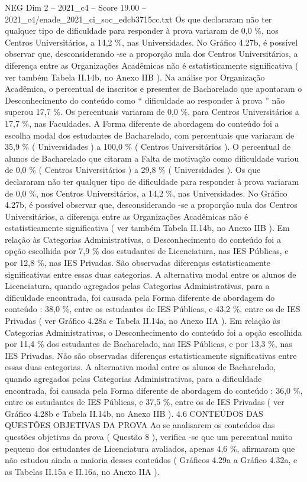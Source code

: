 \begin{textsample}{NEG Dim 2 – 2021\_c4 – Score 19.00 – 2021\_c4/enade\_2021\_ci\_soc\_edcb3715cc.txt}
Os que declararam não ter qualquer tipo de dificuldade para responder à prova variaram de 0,0 \%, nos Centros Universitários, a 14,2 \%, nas Universidades.
No Gráfico 4.27b, é possível observar que, desconsiderando -se a proporção nula dos Centros Universitários, a diferença entre as Organizações Acadêmicas não é estatisticamente significativa ( ver também Tabela II.14b, no Anexo IIB ).
Na análise por Organização Acadêmica, o percentual de inscritos e presentes de Bacharelado que apontaram o Desconhecimento do conteúdo como “ dificuldade ao responder à prova ” não superou 17,7 \%.
Os percentuais variaram de 0,0 \%, para Centros Universitários a 17,7 \%, nas Faculdades.
A Forma diferente de abordagem do conteúdo foi a escolha modal dos estudantes de Bacharelado, com percentuais que variaram de 35,9 \% ( Universidades ) a 100,0 \% ( Centros Universitários ).
O percentual de alunos de Bacharelado que citaram a Falta de motivação como dificuldade variou de 0,0 \% ( Centros Universitários ) a 29,8 \% ( Universidades ).
Os que declararam não ter qualquer tipo de dificuldade para responder à prova variaram de 0,0 \%, nos Centros Universitários, a 14,2 \%, nas Universidades.
No Gráfico 4.27b, é possível observar que, desconsiderando -se a proporção nula dos Centros Universitários, a diferença entre as Organizações Acadêmicas não é estatisticamente significativa ( ver também Tabela II.14b, no Anexo IIB ).
Em relação às Categorias Administrativas, o Desconhecimento do conteúdo foi a opção escolhida por 7,9 \% dos estudantes de Licenciatura, nas IES Públicas, e por 12,8 \%, nas IES Privadas.
São observadas diferenças estatisticamente significativas entre essas duas categorias.
A alternativa modal entre os alunos de Licenciatura, quando agregados pelas Categorias Administrativas, para a dificuldade encontrada, foi causada pela Forma diferente de abordagem do conteúdo : 38,0 \%, entre os estudantes de IES Públicas, e 43,2 \%, entre os de IES Privadas ( ver Gráfico 4.28a e Tabela II.14a, no Anexo IIA ).
Em relação às Categorias Administrativas, o Desconhecimento do conteúdo foi a opção escolhida por 11,4 \% dos estudantes de Bacharelado, nas IES Públicas, e por 13,3 \%, nas IES Privadas.
Não são observadas diferenças estatisticamente significativas entre essas duas categorias.
A alternativa modal entre os alunos de Bacharelado, quando agregados pelas Categorias Administrativas, para a dificuldade encontrada, foi causada pela Forma diferente de abordagem do conteúdo : 36,0 \%, entre os estudantes de IES Públicas, e 37,5 \%, entre os de IES Privadas ( ver Gráfico 4.28b e Tabela II.14b, no Anexo IIB ). 4.6 CONTEÚDOS DAS QUESTÕES OBJETIVAS DA PROVA Ao se analisarem os conteúdos das questões objetivas da prova ( Questão 8 ), verifica -se que um percentual muito pequeno dos estudantes de Licenciatura avaliados, apenas 4,6 \%, afirmaram que não estudou ainda a maioria desses conteúdos ( Gráficos 4.29a a Gráfico 4.32a, e as Tabelas II.15a e II.16a, no Anexo IIA ).

\end{textsample}

